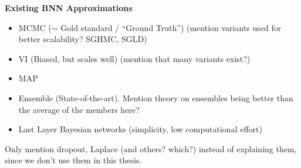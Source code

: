 \documentclass[../thesis.tex]{subfiles}
\begin{document}
\textbf{\large Existing BNN Approximations}
\begin{itemize}
    \item MCMC ($\sim$ Gold standard / ``Ground Truth'') (mention variants used for better scalability? SGHMC, SGLD)
    \item VI (Biased, but scales well) (mention that many variants exist?)
    \item MAP
    \item Ensemble (State-of-the-art). Mention theory on ensembles being better than the average of the members here?
    \item Last Layer Bayesian networks (simplicity, low computational effort)
\end{itemize}
Only mention dropout, Laplace (and others? which?) instead of explaining them, since we don't use them in this thesis.
\end{document}
